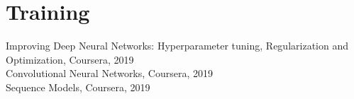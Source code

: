 \documentclass[]{deedy-resume-openfont}
\begin{document}
\begin{minipage}[t]{0.33\textwidth}
\section{Training}
\textbullet{} Improving Deep Neural Networks: Hyperparameter tuning, Regularization and Optimization, Coursera, 2019\\
\textbullet{} Convolutional Neural Networks, Coursera, 2019\\
\textbullet{} Sequence Models, Coursera, 2019
\sectionsep


%
%

\end{minipage} 
\hfill
\end{document}
